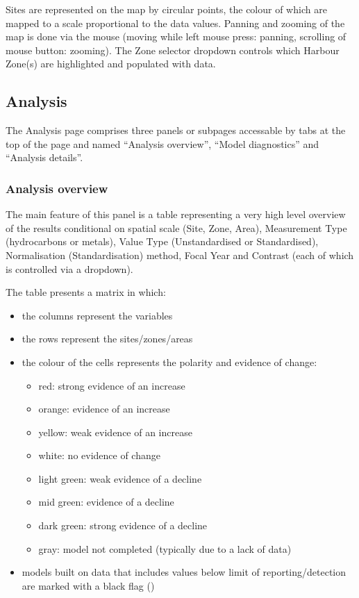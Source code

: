 \documentclass[
  8pt,
  a4paper]{article}
\providecommand{\tightlist}{%
  \setlength{\itemsep}{0pt}\setlength{\parskip}{0pt}}
\begin{document}
Sites are represented on the map by circular points, the colour of which
are mapped to a scale proportional to the data values. Panning and
zooming of the map is done via the mouse (moving while left mouse press:
panning, scrolling of mouse button: zooming). The Zone selector dropdown
controls which Harbour Zone(s) are highlighted and populated with data.

\subsection{Analysis}\label{analysis}

The Analysis page comprises three panels or subpages accessable by tabs
at the top of the page and named ``Analysis overview'', ``Model
diagnostics'' and ``Analysis details''.

\subsubsection{Analysis overview}\label{analysis-overview}

The main feature of this panel is a table representing a very high level
overview of the results conditional on spatial scale (Site, Zone, Area),
Measurement Type (hydrocarbons or metals), Value Type (Unstandardised or
Standardised), Normalisation (Standardisation) method, Focal Year and
Contrast (each of which is controlled via a dropdown).

The table presents a matrix in which:

\begin{itemize}
\item
  the columns represent the variables
\item
  the rows represent the sites/zones/areas
\item
  the colour of the cells represents the polarity and evidence of
  change:

  \begin{itemize}
  \tightlist
  \item
    red: strong evidence of an increase
  \item
    orange: evidence of an increase
  \item
    yellow: weak evidence of an increase
  \item
    white: no evidence of change
  \item
    light green: weak evidence of a decline
  \item
    mid green: evidence of a decline
  \item
    dark green: strong evidence of a decline
  \item
    gray: model not completed (typically due to a lack of data)
  \end{itemize}
\item
  models built on data that includes values below limit of
  reporting/detection are marked with a black flag ({})
\end{itemize}
\end{document}
